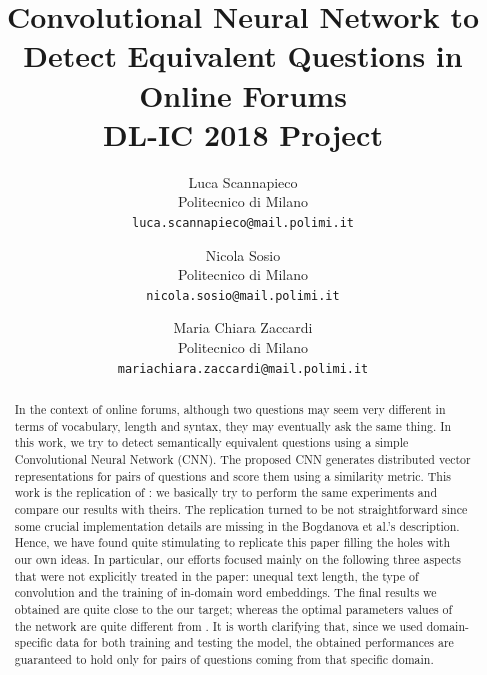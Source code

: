 \documentclass[10pt,twocolumn,letterpaper]{article}
\begin{document}
\title{Convolutional Neural Network to Detect Equivalent Questions in Online Forums  \\ DL-IC 2018 Project} 

\author{Luca Scannapieco\\
Politecnico di Milano\\
{\tt\small luca.scannapieco@mail.polimi.it}
\and
Nicola Sosio\\
Politecnico di Milano\\
{\tt\small nicola.sosio@mail.polimi.it}
\and
Maria Chiara Zaccardi\\
Politecnico di Milano\\
{\tt\small mariachiara.zaccardi@mail.polimi.it}
}

\maketitle

\begin{abstract}
   In the context of online forums, although two questions may seem very different in terms of vocabulary, length and syntax, they may eventually ask the same thing. In this work, we try to detect semantically equivalent questions using a simple Convolutional Neural Network (CNN). The proposed CNN generates distributed vector representations for pairs of questions and score them using a similarity metric. This work is the replication of \cite{bogdanova2015detecting}: we basically try to perform the same experiments and compare our results with theirs. The replication turned to be not straightforward since some crucial implementation details are missing in the Bogdanova et al.'s description. Hence, we have found quite stimulating to replicate this paper filling the holes with our own ideas. In particular, our efforts focused mainly on the following three aspects that were not explicitly treated in the paper: unequal text length, the type of convolution and the training of in-domain word embeddings. The final results we obtained are quite close to the our target; whereas the optimal parameters values of the network are quite different from \cite{bogdanova2015detecting}. It is worth clarifying that, since we used domain-specific data for both training and testing the model, the obtained performances are guaranteed to hold only for pairs of questions coming from that specific domain.
\end{abstract}
\end{document}
